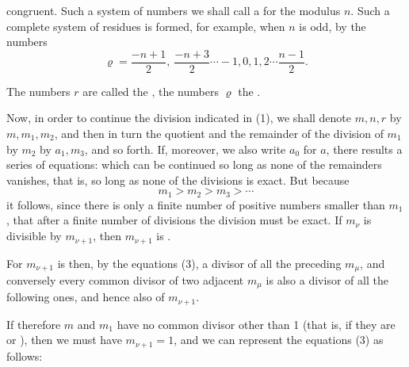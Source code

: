 
congruent. Such a system of numbers we shall call a  for the modulus $n$. Such a complete system of residues is formed, for example, when $n$ is odd, by the numbers
\[
\varrho = \frac{-n+1}{2}, \ \frac{-n+3}{2} \cdots -1, 0, 1, 2 \cdots \frac{n-1}{2}.
\]

The numbers $r$ are called the , the numbers $\varrho$ the .

Now, in order to continue the division indicated in (1), we shall denote $m, n, r$ by $m, m_1, m_2$, and then in turn the quotient and the remainder of the division of $m_1$ by $m_2$ by $a_1, m_3$, and so forth. If, moreover, we also write $a_0$ for $a$, there results a series of equations:
which can be continued so long as none of the remainders vanishes, that is, so long as none of the divisions is exact. But because
\[
m_1 > m_2 > m_3 > \cdots
\]
it follows, since there is only a finite number of positive numbers smaller than $m_1$, that after a finite number of divisions the division must be exact. If $m_\nu$ is divisible by $m_{\nu+1}$, then $m_{\nu+1}$ is .

For $m_{\nu+1}$ is then, by the equations (3), a divisor of all the preceding $m_\mu$, and conversely every common divisor of two adjacent $m_\mu$ is also a divisor of all the following ones, and hence also of $m_{\nu+1}$.

If therefore $m$ and $m_1$ have no common divisor other than 1 (that is, if they are  or ), then we must have $m_{\nu+1} = 1$, and we can represent the equations (3) as follows:
